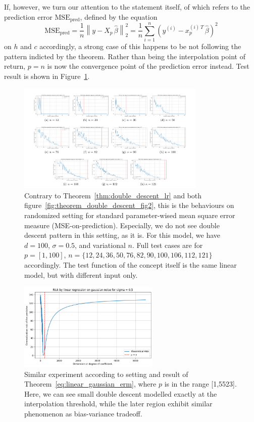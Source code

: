 \documentclass[10pt]{article} %
\begin{document}
If, however, we turn our attention to the statement itself, of which refers to the prediction error $\mathrm{MSE}_{\mathrm{pred}}$, defined by the equation
\begin{equation}
\mathrm{MSE}_{\mathrm{pred}}
=
\frac{1}{n}
\left\lVert
  y - X_{p}\,\hat\beta
\right\rVert_{2}^{2}
=
\frac{1}{n}
\sum_{i=1}^{n}
\left(
  y^{(i)} - x_{p}^{(i)\,T}\,\hat\beta
\right)^{2}
\end{equation}
on $h$ and $c$ accordingly, a strong case of this happens to be not following the pattern indicted by the theorem. Rather than being the interpolation point of return, $p=n$ is now the convergence point of the prediction error instead. Test result is shown in Figure~\ref{fig:theorem_double_descent_fig3}.

\begin{figure}[H]
    \centering
    \includegraphics[width=0.8\textwidth]{pdf/theorem_3.pdf}
    \caption{Contrary to Theorem~\ref{thm:double_descent_lr} and both figure~\ref{fig:theorem_double_descent_fig2}, this is the behaviours on randomized setting for standard parameter-wised mean square error measure (MSE-on-prediction). Especially, we do not see double descent pattern in this setting, as it is. For this model, we have $d=100$, $\sigma = 0.5$, and variational $n$. Full test cases are for $p=[1,100]$, $n=\{12,24,36,50,76,82,90,100,106,112,121\}$ accordingly. The test function of the concept itself is the same linear model, but with different input only.}
    \label{fig:theorem_double_descent_fig3}
\end{figure}
\begin{figure}[H]
  \centering
  \includegraphics[width=0.6\textwidth]{media/dimensional_descent.png}
  \caption{Similar experiment according to setting and result of Theorem~\ref{eq:linear_gaussian_erm}, where $p$ is in the range [1,5523]. Here, we can see small double descent modelled exactly at the interpolation threshold, while the later region exhibit similar phenomenon as bias-variance tradeoff.}
  \label{fig:contrarian}
\end{figure}
\end{document}
